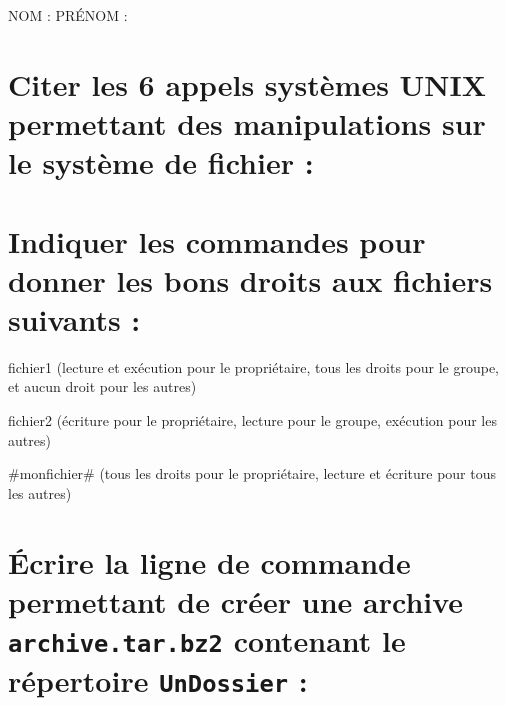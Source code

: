 \documentclass[11pt,a4paper]{article}
\author{Fabrice BOISSIER}
\begin{document}
\setlength{\fboxrule}{2pt}

\noindent {}

\bigskip

NOM : \hspace{6.5cm} PR\'ENOM :

\smallskip

\section{Citer les 6 appels systèmes UNIX permettant des manipulations sur le système de fichier : }

\bigskip
\bigskip
\bigskip
\bigskip
\bigskip

\section{Indiquer les commandes pour donner les bons droits aux fichiers suivants :}

\medskip

\noindent fichier1 (lecture et exécution pour le propriétaire, tous les droits pour le groupe, et aucun droit pour les autres)

\medskip

\noindent fichier2 (écriture pour le propriétaire, lecture pour le groupe, exécution pour les autres)

\medskip

\noindent \#monfichier\# (tous les droits pour le propriétaire, lecture et écriture pour tous les autres)

\medskip

\bigskip
\bigskip
\bigskip
\bigskip
\bigskip
\bigskip
\bigskip
\bigskip
\bigskip
\bigskip
\bigskip

\section{\'Ecrire la ligne de commande permettant de créer une archive \newline \texttt{archive.tar.bz2} contenant le répertoire \texttt{UnDossier} : }
\end{document}
